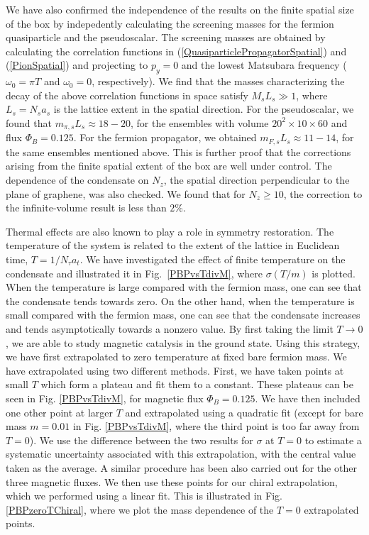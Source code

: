 \documentclass[aps,prd,twocolumn,showpacs,superscriptaddress,groupedaddress]{revtex4}  %
\begin{document}
We have also confirmed the independence of the results on the finite spatial size of the box by indepedently calculating the screening
masses for the fermion quasiparticle and the pseudoscalar. The screening masses are obtained by calculating the correlation functions in (\ref{QuasiparticlePropagatorSpatial}) and (\ref{PionSpatial}) and projecting to $p_y=0$ and the lowest Matsubara frequency ($\omega_0 = \pi T$ and $\omega_0 = 0$, respectively).
We find that the masses characterizing the decay of the above correlation functions in space satisfy $M_s L_s \gg 1$, where $L_s = N_s a_s$ is the  lattice extent in the spatial direction. For the pseudoscalar, we found that $m_{\pi,s}L_s \approx 18-20$, for the ensembles with volume $20^2\times10\times60$ and flux $\Phi_B=0.125$. For the fermion propagator, we obtained $m_{F,s}L_s \approx 11-14$, for the same ensembles mentioned above. This is further proof that the corrections arising from the finite spatial extent of the box are well under control. The dependence of the condensate on $N_z$, the spatial direction perpendicular to the plane of graphene, was also checked. We found that for $N_z \geq 10$, the correction to the infinite-volume result is less than $2\%$.
 
Thermal effects are also known to play a role in symmetry restoration. The temperature of the system is related to the extent of the lattice in Euclidean time, $T = 1/N_{\tau}a_t$. We have investigated the effect of finite temperature on the condensate and illustrated it in Fig.~\ref{PBPvsTdivM}, where $\sigma(T/m)$ is plotted. When the temperature is large 
compared with the fermion mass, one can see that the condensate tends towards zero. On the other hand, when the temperature is small compared with the fermion mass, one can see that the condensate increases and tends asymptotically towards a nonzero value. By first taking the limit $T \to 0$, we are able to study magnetic catalysis in the ground state. Using this strategy, we have first extrapolated to zero temperature at fixed bare fermion mass. We have extrapolated using two different methods. First, we have taken points at small $T$ which form a plateau and fit them to a constant. These plateaus can be seen in Fig. \ref{PBPvsTdivM}, for magnetic flux $\Phi_B=0.125$. We have then included one other point at larger $T$ and extrapolated using a quadratic fit (except for bare mass $m=0.01$ in Fig. \ref{PBPvsTdivM}, where the third point is too far away from $T=0$). We use the difference between the two results for $\sigma$ at $T=0$ to estimate a systematic uncertainty associated with this extrapolation, with the central value taken as the average. A similar procedure has been also carried out for the other three magnetic fluxes. We then use these points for our chiral extrapolation, which we performed using a linear fit. This is illustrated in Fig. \ref{PBPzeroTChiral}, where we plot the mass dependence of the $T=0$ extrapolated points.
\end{document}
